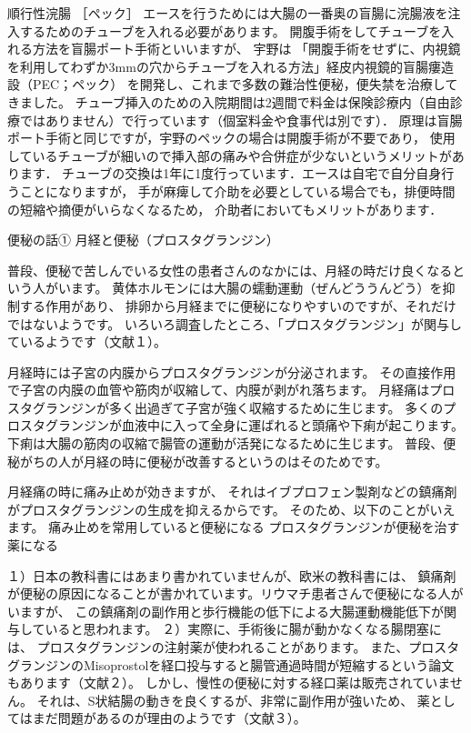 順行性浣腸
［ペック］
エースを行うためには大腸の一番奥の盲腸に浣腸液を注入するためのチューブを入れる必要があります。
開腹手術をしてチューブを入れる方法を盲腸ポート手術といいますが、
宇野は 「開腹手術をせずに、内視鏡を利用してわずか3mmの穴からチューブを入れる方法」経皮内視鏡的盲腸瘻造設（PEC；ペック）
を開発し、これまで多数の難治性便秘，便失禁を治療してきました。
チューブ挿入のための入院期間は2週間で料金は保険診療内（自由診療ではありません）で行っています（個室料金や食事代は別です）．
原理は盲腸ポート手術と同じですが，宇野のペックの場合は開腹手術が不要であり，
使用しているチューブが細いので挿入部の痛みや合併症が少ないというメリットがあります．
チューブの交換は1年に1度行っています．エースは自宅で自分自身行うことになりますが，
手が麻痺して介助を必要としている場合でも，排便時間の短縮や摘便がいらなくなるため，
介助者においてもメリットがあります．


便秘の話①
月経と便秘（プロスタグランジン） 

普段、便秘で苦しんでいる女性の患者さんのなかには、月経の時だけ良くなるという人がいます。
黄体ホルモンには大腸の蠕動運動（ぜんどううんどう）を抑制する作用があり、
排卵から月経までに便秘になりやすいのですが、それだけではないようです。 
いろいろ調査したところ、「プロスタグランジン」が関与しているようです（文献１）。 

月経時には子宮の内膜からプロスタグランジンが分泌されます。
その直接作用で子宮の内膜の血管や筋肉が収縮して、内膜が剥がれ落ちます。 
月経痛はプロスタグランジンが多く出過ぎて子宮が強く収縮するために生じます。
多くのプロスタグランジンが血液中に入って全身に運ばれると頭痛や下痢が起こります。
下痢は大腸の筋肉の収縮で腸管の運動が活発になるために生じます。 
普段、便秘がちの人が月経の時に便秘が改善するというのはそのためです。
 
月経痛の時に痛み止めが効きますが、
それはイブプロフェン製剤などの鎮痛剤がプロスタグランジンの生成を抑えるからです。 
そのため、以下のことがいえます。 
痛み止めを常用していると便秘になる 
プロスタグランジンが便秘を治す薬になる 

１）日本の教科書にはあまり書かれていませんが、欧米の教科書には、
鎮痛剤が便秘の原因になることが書かれています。リウマチ患者さんで便秘になる人がいますが、
この鎮痛剤の副作用と歩行機能の低下による大腸運動機能低下が関与していると思われます。 
２）実際に、手術後に腸が動かなくなる腸閉塞には、
プロスタグランジンの注射薬が使われることがあります。
また、プロスタグランジンのMisoprostolを経口投与すると腸管通過時間が短縮するという論文もあります（文献２）。
しかし、慢性の便秘に対する経口薬は販売されていません。
それは、S状結腸の動きを良くするが、非常に副作用が強いため、
薬としてはまだ問題があるのが理由のようです（文献３）。 

